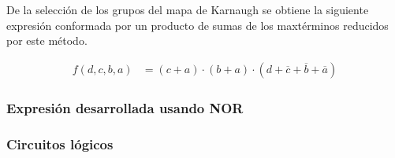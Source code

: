 De la selecci\'on de los grupos del mapa de Karnaugh se obtiene la siguiente expresi\'on conformada por un producto
de sumas de los maxt\'erminos reducidos por este m\'etodo.

\begin{equation*}
\begin{align*}
f(d,c,b,a) & = {(c+a)}
\cdot {(b+a)}
\cdot {(d+\overline{c}+\overline{b}+\overline{a})} 
\end{align*}
\end{equation*}

\subsubsection{Expresión desarrollada usando NOR}

\subsubsection{Circuitos lógicos}

